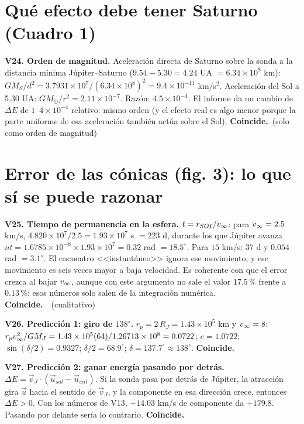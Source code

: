 \documentclass[11pt,letterpaper]{article}
\newcommand{\ok}{\textbf{Coincide.}\ }
\begin{document}
\section{Qué efecto debe tener Saturno (Cuadro 1)}
\textbf{V24. Orden de magnitud.} Aceleración directa de Saturno sobre la sonda a la distancia mínima Júpiter--Saturno ($9.54-5.30=4.24$ UA $=6.34\times10^8$ km): $GM_S/d^2=3.7931\times10^7/(6.34\times10^8)^2=9.4\times10^{-11}$ km/s$^2$. Aceleración del Sol a 5.30 UA: $GM_\odot/r^2=2.11\times10^{-7}$. Razón: $4.5\times10^{-4}$. El informe da un cambio de $\Delta E$ de $1$--$4\times10^{-4}$ relativo: mismo orden (y el efecto real es algo menor porque la parte uniforme de esa aceleración también actúa sobre el Sol). \ok (solo como orden de magnitud)

\section{Error de las cónicas (fig. 3): lo que sí se puede razonar}
\textbf{V25. Tiempo de permanencia en la esfera.} $t=r_{SOI}/v_\infty$: para $v_\infty=2.5$ km/s, $4.820\times10^7/2.5=1.93\times10^7$ s $=223$ d, durante los que Júpiter avanza $n t=1.6785\times10^{-8}\times1.93\times10^7=0.32$ rad $=18.5^\circ$. Para $15$ km/s: $37$ d y $0.054$ rad $=3.1^\circ$. El encuentro <<instantáneo>> ignora ese movimiento, y ese movimiento es seis veces mayor a baja velocidad. Es coherente con que el error crezca al bajar $v_\infty$, aunque con este argumento no sale el valor $17.5\,\%$ frente a $0.13\,\%$: esos números solo salen de la integración numérica. \ok\ (cualitativo)

\textbf{V26. Predicción 1: giro de $138^\circ$.} $r_p=2\,R_J=1.43\times10^5$ km y $v_\infty=8$: $r_pv_\infty^2/GM_J=1.43\times10^5(64)/1.26713\times10^8=0.0722$; $e=1.0722$; $\sin(\delta/2)=0.9327$; $\delta/2=68.9^\circ$; $\delta=137.7^\circ\approx138^\circ$. \ok

\textbf{V27. Predicción 2: ganar energía pasando por detrás.} $\Delta E=\vec v_J\cdot(\vec u_{sal}-\vec u_{ent})$. Si la sonda pasa por detrás de Júpiter, la atracción gira $\vec u$ hacia el sentido de $\vec v_J$, y la componente en esa dirección crece, entonces $\Delta E>0$. Con los números de V13, $+14.03$ km/s de componente da $+179.8$. Pasando por delante sería lo contrario. \ok
\end{document}
